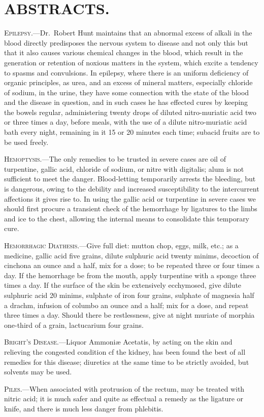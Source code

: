\chapter*[Abstracts.]{ABSTRACTS.}

\textsc{Epilepsy.}---Dr.\ Robert Hunt maintains that an abnormal excess of
alkali in the blood directly predisposes the nervous system to disease
and not only this but that it also causes various chemical changes in
the blood, which result in the generation or retention of noxious matters
in the system, which excite a tendency to spasms and convulsions. In
epilepsy, where there is an uniform deficiency of organic principles, as
urea, and an excess of mineral matters, especially chloride of sodium,
in the urine, they have some connection with the state of the blood and
the disease in question, and in such cases he has effected cures by keeping
the bowels regular, administering twenty drops of diluted nitro-muriatic
acid two or three times a day, before meals, with the use of a
dilute nitro-muriatic acid bath every night, remaining in it 15 or 20
minutes each time; subacid fruits are to be used freely.

\textsc{Hemoptysis.}---The only remedies to be trusted in severe cases are oil
of turpentine, gallic acid, chloride of sodium, or nitre with digitalis;
alum is not sufficient to meet the danger. Blood-letting temporarily
arrests the bleeding, but is dangerous, owing to the debility and increased
susceptibility to the intercurrent affections it gives rise to. In using the
gallic acid or turpentine in severe cases we should first procure a transient
check of the hemorrhage by ligatures to the limbs and ice to the chest,
allowing the internal means to consolidate this temporary cure.

\textsc{Hemorrhagic Diathesis.}---Give full diet: mutton chop, eggs, milk,
etc.; as a medicine, gallic acid five grains, dilute sulphuric acid twenty
minims, decoction of cinchona an ounce and a half, mix for a dose; to
be repeated three or four times a day. If the hemorrhage be from the
mouth, apply turpentine with a sponge three times a day. If the surface
of the skin be extensively ecchymosed, give dilute sulphuric acid 20
minims, sulphate of iron four grains, sulphate of magnesia half a drachm,
infusion of columbo an ounce and a half; mix for a dose, and repeat
three times a day. Should there be restlessness, give at night muriate
of morphia one-third of a grain, lactucarium four grains.

\textsc{Bright's Disease.}---Liquor Ammoniæ Acetatis, by acting on the skin
and relieving the congested condition cf the kidney, has been found the
best of all remedies for this disease; diuretics at the same time to be
strictly avoided, but solvents may be used.

\textsc{Piles.}---When associated with protrusion of the rectum, may be
treated with nitric acid; it is much safer and quite as effectual a
remedy as the ligature or knife, and there is much less danger from
phlebitis.\endinput
